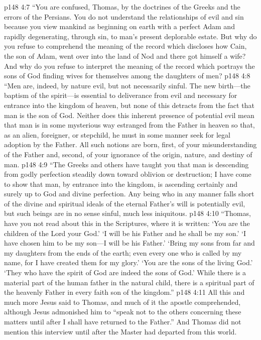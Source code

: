 \vs p148 4:7 \textcolor{ubdarkred}{“You are confused, Thomas, by the doctrines of the Greeks and the errors of the Persians. You do not understand the relationships of evil and sin because you view mankind as beginning on earth with a perfect Adam and rapidly degenerating, through sin, to man’s present deplorable estate. But why do you refuse to comprehend the meaning of the record which discloses how Cain, the son of Adam, went over into the land of Nod and there got himself a wife? And why do you refuse to interpret the meaning of the record which portrays the sons of God finding wives for themselves among the daughters of men?}\plusone
\vs p148 4:8 \textcolor{ubdarkred}{“Men are, indeed, by nature evil, but not necessarily sinful. The new birth---the baptism of the spirit---is essential to deliverance from evil and necessary for entrance into the kingdom of heaven, but none of this detracts from the fact that man is the son of God. Neither does this inherent presence of potential evil mean that man is in some mysterious way estranged from the Father in heaven so that, as an alien, foreigner, or stepchild, he must in some manner seek for legal adoption by the Father. All such notions are born, first, of your misunderstanding of the Father and, second, of your ignorance of the origin, nature, and destiny of man.}
\vs p148 4:9 \textcolor{ubdarkred}{“The Greeks and others have taught you that man is descending from godly perfection steadily down toward oblivion or destruction; I have come to show that man, by entrance into the kingdom, is ascending certainly and surely up to God and divine perfection. Any being who in any manner falls short of the divine and spiritual ideals of the eternal Father’s will is potentially evil, but such beings are in no sense sinful, much less iniquitous.}
\vs p148 4:10 \textcolor{ubdarkred}{“Thomas, have you not read about this in the Scriptures, where it is written: ‘You are the children of the Lord your God.’ ‘I will be his Father and he shall be my son.’ ‘I have chosen him to be my son---I will be his Father.’ ‘Bring my sons from far and my daughters from the ends of the earth; even every one who is called by my name, for I have created them for my glory.’ ‘You are the sons of the living God.’ ‘They who have the spirit of God are indeed the sons of God.’ While there is a material part of the human father in the natural child, there is a spiritual part of the heavenly Father in every faith son of the kingdom.”}
\pc \vs p148 4:11 All this and much more Jesus said to Thomas, and much of it the apostle comprehended, although Jesus admonished him to \textcolor{ubdarkred}{“speak not to the others concerning these matters until after I shall have returned to the Father.”} And Thomas did not mention this interview until after the Master had departed from this world.
